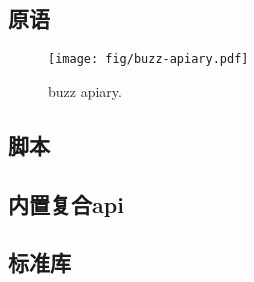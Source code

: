 \subsection{原语\statusred}\label{sec:primitives}


\begin{figure}[htbp]
   \centering
   \texttt{[image: fig/buzz-apiary.pdf]}
   \caption[buzz apiary \statusgreen]{buzz apiary. }
   \label{fig:buzz-apiary}
\end{figure}

\subsection{脚本\statusred}
\label{sec:buzz}

\subsection{内置复合api \statusred}
\label{sec:lego}

\subsection{标准库\statusred}
\label{sec:stdlib}